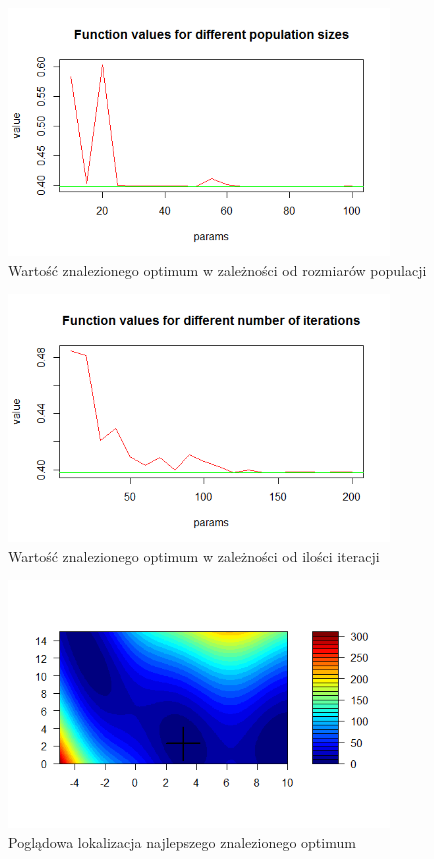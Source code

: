 \documentclass[11pt, a4paper]{article}
\begin{document}
\begin{figure}[H]
	\centering
	\includegraphics[width=0.9\textwidth]{./assets/branin5.png} %
	\caption{Wartość znalezionego optimum w zależności od rozmiarów populacji}
	\label{fig:branin5}
\end{figure}

\begin{figure}[H]
	\centering
	\includegraphics[width=0.9\textwidth]{./assets/branin6.png} %
	\caption{Wartość znalezionego optimum w zależności od ilości iteracji}
	\label{fig:branin6}
\end{figure}

\begin{figure}[H]
	\centering
	\includegraphics[width=0.9\textwidth]{./assets/branin7.png} %
	\caption{Poglądowa lokalizacja najlepszego znalezionego optimum}
	\label{fig:branin7}
\end{figure}
\end{document}
